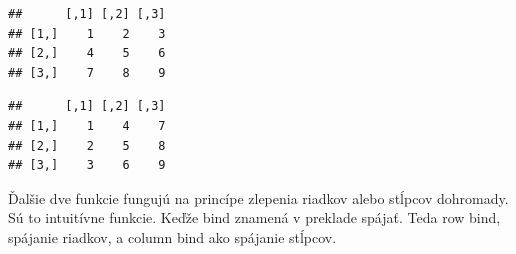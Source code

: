 \begin{Shaded}
\begin{Highlighting}[]

\StringTok{ }\NormalTok{(}\NormalTok{, }\NormalTok{, }\NormalTok{, }\NormalTok{, }\NormalTok{, }\NormalTok{, }\NormalTok{, }\NormalTok{, }\NormalTok{)}


\StringTok{ } \NormalTok{, } \NormalTok{, } \NormalTok{)}

\end{Highlighting}
\end{Shaded}

\begin{verbatim}
##      [,1] [,2] [,3]
## [1,]    1    2    3
## [2,]    4    5    6
## [3,]    7    8    9
\end{verbatim}

\begin{Shaded}
\begin{Highlighting}[]

\StringTok{ } \NormalTok{, } \NormalTok{, } \NormalTok{)}

\end{Highlighting}
\end{Shaded}

\begin{verbatim}
##      [,1] [,2] [,3]
## [1,]    1    4    7
## [2,]    2    5    8
## [3,]    3    6    9
\end{verbatim}

Ďalšie dve funkcie fungujú na princípe zlepenia riadkov alebo stĺpcov
dohromady. Sú to intuitívne funkcie. Keďže bind znamená v preklade
spájať. Teda row bind, spájanie riadkov, a column bind ako spájanie
stĺpcov.

